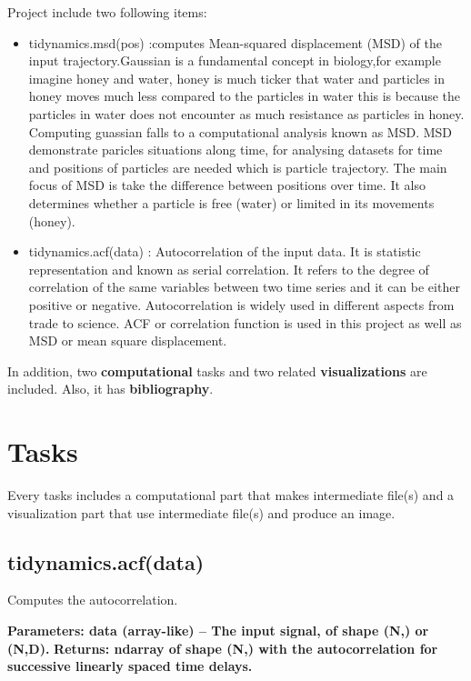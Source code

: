 \documentclass[12pt, a4paper, twoside]{report}
\begin{document}
Project include two following items:\newline
\begin{itemize}
  \item tidynamics.msd(pos) :computes Mean-squared displacement (MSD) of the input trajectory.Gaussian is a fundamental concept in biology,for example imagine honey and water, honey is much ticker that water and particles in honey moves much less compared to the particles in water this is because the particles in water does not encounter as much resistance as particles in honey. Computing guassian falls to a computational analysis known as MSD. MSD demonstrate paricles situations along time, for analysing datasets for time and positions of particles are needed which is particle trajectory. The main focus of MSD is take the difference between positions over time. It also determines whether a particle is free (water) or limited in its movements (honey).\newline 
  \item tidynamics.acf(data) : Autocorrelation of the input data. It is statistic representation and known as serial correlation. It refers to the degree of correlation of the same variables between two time series and it can be either positive or negative. Autocorrelation is widely used in different aspects from trade to science. ACF or correlation function is used in this project as well as MSD or mean square displacement.\newpage 

\end{itemize}
In addition, two \textbf{computational} tasks and two related \textbf{visualizations} are included. Also, it has \textbf{bibliography}.

\newpage
\section{Tasks}

Every tasks includes a computational part that makes intermediate file(s) and a visualization part that use intermediate file(s) and produce an image.  

\subsection{tidynamics.acf(data)}
Computes the autocorrelation.


\textbf{ Parameters:	data (array-like) – The input signal, of shape (N,) or (N,D).}\newline
\textbf{ Returns:	ndarray of shape (N,) with the autocorrelation for successive linearly spaced time delays.}
 
\end{document}
